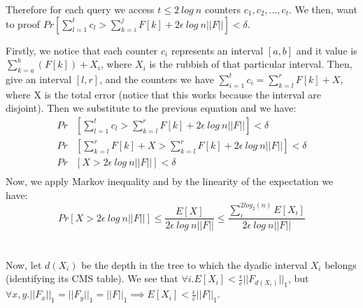 \documentclass[a4paper]{article}
\begin{document}

Therefore for each query we access $t \leq 2\ log\ n$ counters $c_1,c_2,...,c_t$. We then, want to proof $Pr[\sum^t_{l=1}c_l > \sum^j_{k=i}F[k] + 2\epsilon\ log\ n ||F||]<\delta$.

Firstly, we notice that each counter $c_i$ represents an interval $[a,b]$ and it value is $\sum_{k=a}^b (F[k]) + X_i$, where $X_i$ is the rubbish of that particular interval. Then, give an interval $[l,r]$, and the counters we have $\sum^t_{i=1}c_i = \sum^r_{k=l}F[k] +X $, where X is the total error (notice that this works because the interval are disjoint). Then we substitute to the previous equation and we have:
\begin{align*}
Pr &[\sum^t_{l=1}c_l > \sum^r_{k=l}F[k] + 2\epsilon\ log\ n ||F||]<\delta \\
Pr &[ \sum^r_{k=l}F[k] +X  > \sum^r_{k=l}F[k] + 2\epsilon\ log\ n ||F||]<\delta \\
Pr &[ X  >  2\epsilon\ log\ n ||F||]<\delta \\
\end{align*}
Now, we apply Markov inequality and by the linearity of the expectation we have: $$Pr [ X  >  2\epsilon\ log\ n ||F||] \leq \frac{E[X]}{2\epsilon\ log\ n ||F||} \leq \frac{\sum_{i}^{2log_2(n)} E[X_i]}{2\epsilon\ log\ n ||F||}$$
\\
\\
Now, let $d(X_i)$ be the depth in the tree to which the dyadic interval $X_i$ belongs (identifying its CMS table). We see that $\forall i.E[X_i]< \frac{\epsilon}{e}||F_{d(X_i)}||_1$, but $\forall  x, y.||F_x||_1 = ||F_y||_1 = ||F||_1 \implies E[X_i]< \frac{\epsilon}{e}||F||_1$.
\end{document}
